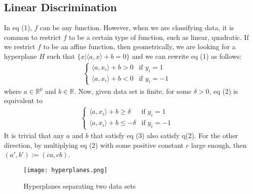 \documentclass[11pt, a4paper]{article}
\begin{document}
\subsection{Linear Discrimination}
In eq (1), $f$ can be any function. However, when we are classifying data, it is common to restrict $f$ to be a certain type of function, such as linear, quadratic. 
If we restrict $f$ to be an affine function, then geometrically, we are looking for a hyperplane $H$ such that $\{x|\langle a,x\rangle + b = 0\}$ and we can rewrite eq (1) as follows:
\begin{align}
\begin{cases}
\langle a, x_i \rangle + b > 0&\text{if }y_i = 1\\
\langle a, x_i \rangle + b < 0&\text{if }y_i = -1
\end{cases}
\end{align}
where $a\in \mathbb{R}^p$ and $b\in\mathbb{R}$. Now, given data set is finite, for some $\delta > 0$, eq (2) is equivalent to \begin{align}
\begin{cases}
\langle a, x_i \rangle + b \ge \delta&\text{if }y_i = 1\\
\langle a, x_i \rangle + b \le -\delta&\text{if }y_i = -1
\end{cases}
\end{align}
It is trivial that any $a$ and $b$ that satisfy eq (3) also satisfy q(2). For the other direction, by multiplying eq (2) with some positive constant $c$ large enough, then $(a',b') := (ca, cb)$.
\begin{figure}[h]
    \centering
    \texttt{[image: hyperplanes.png]}
    \caption{Hyperplanes separating two data sets}
    \label{fig:my_label}
\end{figure}
\end{document}
